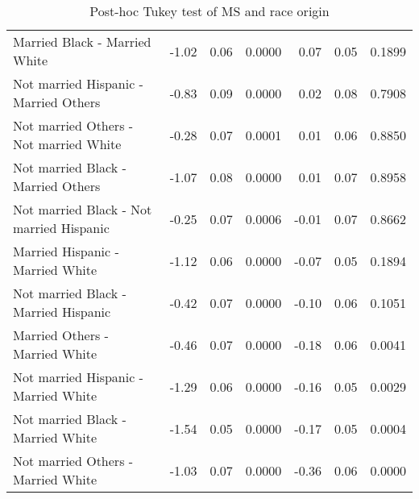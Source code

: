 \documentclass[11pt]{extarticle} %
\begin{document}
\begin{table}[ht]
\begin{tabular}{lrrrrrr}
    Married Black -  Married White & -1.02 & 0.06 & 0.0000 & 0.07 & 0.05 & 0.1899 \\ 
    Not married Hispanic -  Married Others & -0.83 & 0.09 & 0.0000 & 0.02 & 0.08 & 0.7908 \\ 
    Not married Others -  Not married White & -0.28 & 0.07 & 0.0001 & 0.01 & 0.06 & 0.8850 \\ 
    Not married Black -  Married Others & -1.07 & 0.08 & 0.0000 & 0.01 & 0.07 & 0.8958 \\ 
    Not married Black -  Not married Hispanic & -0.25 & 0.07 & 0.0006 & -0.01 & 0.07 & 0.8662 \\ 
    Married Hispanic -  Married White & -1.12 & 0.06 & 0.0000 & -0.07 & 0.05 & 0.1894 \\ 
    Not married Black -  Married Hispanic & -0.42 & 0.07 & 0.0000 & -0.10 & 0.06 & 0.1051 \\ 
    Married Others -  Married White & -0.46 & 0.07 & 0.0000 & -0.18 & 0.06 & 0.0041 \\ 
    Not married Hispanic -  Married White & -1.29 & 0.06 & 0.0000 & -0.16 & 0.05 & 0.0029 \\ 
    Not married Black -  Married White & -1.54 & 0.05 & 0.0000 & -0.17 & 0.05 & 0.0004 \\ 
    Not married Others -  Married White & -1.03 & 0.07 & 0.0000 & -0.36 & 0.06 & 0.0000 \\ 
   \hline
\end{tabular}
\caption{Post-hoc Tukey test of MS and race origin} 
\label{tab:Table7RaceOriginMS}
\end{table}
\end{document}

